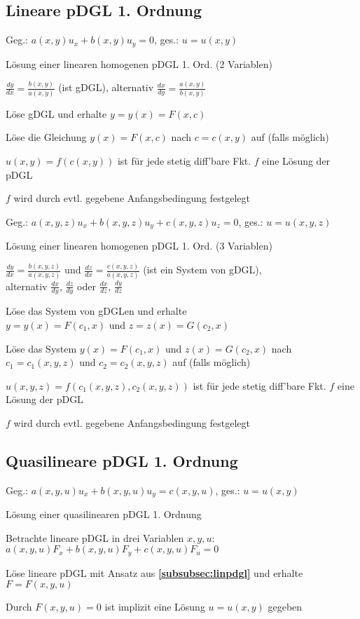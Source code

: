 \documentclass[german,color,6pt]{latex4ei/latex4ei_fs}
\begin{document}
\begin{sectionbox}
	\subsection{Lineare pDGL 1. Ordnung}
	Geg.: $a(x,y)u_x+b(x,y)u_y=0$, ges.: $u=u(x,y)$
	\begin{cookbox}{Lösung einer linearen homogenen pDGL 1. Ord. (2 Variablen)}
		\item $\frac{dy}{dx}=\frac{b(x,y)}{a(x,y)}$ (ist gDGL), alternativ $\frac{dx}{dy}=\frac{a(x,y)}{b(x,y)}$ 
		\item Löse gDGL und erhalte $y=y(x)=F(x,c) $
		\item Löse die Gleichung $y(x)=F(x,c)$ nach $c = c(x,y)$ auf (falls möglich)
		\item $u(x,y)=f(c(x,y))$ ist für jede stetig diff'bare Fkt. $f$ eine Lösung der pDGL
		\item $f$ wird durch evtl. gegebene Anfangsbedingung festgelegt
	\end{cookbox}
	\label{subsubsec:linpdgl}
	Geg.: $a(x,y,z)u_x+b(x,y,z)u_y+c(x,y,z)u_z=0$, ges.: $u=u(x,y,z)$
	\begin{cookbox}{Lösung einer linearen homogenen pDGL 1. Ord. (3 Variablen)}
		\item $\frac{dy}{dx}=\frac{b(x,y,z)}{a(x,y,z)}$ und $\frac{dz}{dx}=\frac{c(x,y,z)}{a(x,y,z)}$ (ist ein System von gDGL), \\
			alternativ $\frac{dx}{dy}$, $\frac{dz}{dy}$ oder $\frac{dx}{dz}$, $\frac{dy}{dz}$
		\item Löse das System von gDGLen und erhalte \\$y=y(x)=F(c_{1},x) $ und $z=z(x)=G(c_{2},x) $
		\item Löse das System $y(x)=F(c_{1},x) $ und $z(x)=G(c_{2},x) $ nach $c_{1}=c_{1}(x,y,z) $ und $c_{2}=c_{2}(x,y,z) $ auf (falls möglich)
		\item $ u(x,y,z)=f(c_{1}(x,y,z),c_{2}(x,y,z))$ ist für jede stetig diff'bare Fkt. $f$ eine Lösung der pDGL
		\item $f $ wird durch evtl. gegebene Anfangsbedingung festgelegt
	\end{cookbox}
\end{sectionbox}

\begin{sectionbox}
	\subsection{Quasilineare pDGL 1. Ordnung}
	Geg.: $a(x,y,u)u_x+b(x,y,u)u_y=c(x,y,u)$, ges.: $u=u(x,y)$
	\begin{cookbox}{Lösung einer quasilinearen pDGL 1. Ordnung}
		\item Betrachte lineare pDGL in drei Variablen $x,y,u$:
		\\$a(x,y,u)F_{x}+b(x,y,u)F_{y}+c(x,y,u)F_{u}=0$
		\item Löse lineare pDGL mit Ansatz aus {\bf\ref{subsubsec:linpdgl}} und erhalte	$F=F(x,y,u) $
		\item Durch $F(x,y,u)=0 $ ist implizit eine Lösung $u=u(x,y) $ gegeben
	\end{cookbox}
\end{sectionbox}


\end{document}
